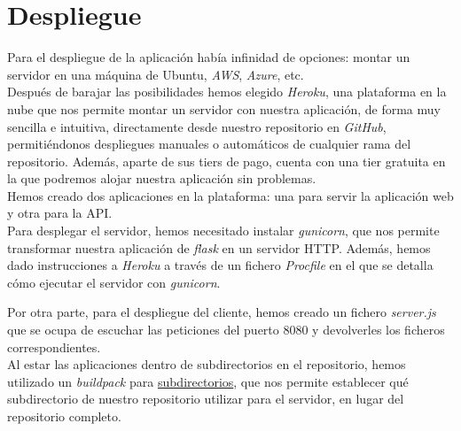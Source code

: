 \section{Despliegue}\label{sec:despliegue}
Para el despliegue de la aplicación había infinidad de opciones: montar un servidor en una máquina de Ubuntu,
\textit{AWS}\cite{aws}, \textit{Azure}\cite{azure}, etc.\\

Después de barajar las posibilidades hemos elegido \textit{Heroku}, una plataforma en la nube que nos permite montar un
servidor con nuestra aplicación, de forma muy sencilla e intuitiva, directamente desde nuestro repositorio en
\textit{GitHub}, permitiéndonos despliegues manuales o automáticos de cualquier rama del repositorio. Además, aparte de
sus tiers de pago, cuenta con una tier gratuita en la que podremos alojar nuestra aplicación sin problemas.\\

Hemos creado dos aplicaciones en la plataforma: una para servir la aplicación web y otra para la API.\\

Para desplegar el servidor, hemos necesitado instalar \textit{gunicorn}\cite{gunicorn}, que nos permite transformar
nuestra aplicación de \textit{flask} en un servidor HTTP. Además, hemos dado instrucciones a \textit{Heroku} a través de
un fichero \textit{Procfile} en el que se detalla cómo ejecutar el servidor con \textit{gunicorn}.

Por otra parte, para el despliegue del cliente, hemos creado un fichero \textit{server.js} que se ocupa de escuchar las
peticiones del puerto 8080 y devolverles los ficheros correspondientes.\\

Al estar las aplicaciones dentro de subdirectorios en el repositorio, hemos utilizado un \textit{buildpack} para
\href{https://github.com/timanovsky/subdir-heroku-buildpack.git}{subdirectorios}, que nos permite establecer qué
subdirectorio de nuestro repositorio utilizar para el servidor, en lugar del repositorio completo.\\
